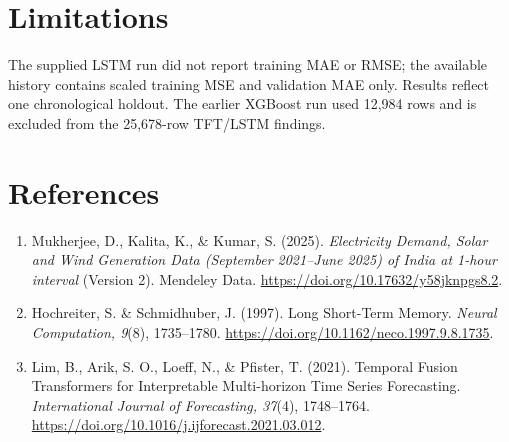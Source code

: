\documentclass[11pt,a4paper]{article}
\begin{document}
\section{Limitations}
The supplied LSTM run did not report training MAE or RMSE; the available history contains scaled training MSE and validation MAE only. Results reflect one chronological holdout. The earlier XGBoost run used 12,984 rows and is excluded from the 25,678-row TFT/LSTM findings.
\section{References}
\begin{enumerate}[leftmargin=*]
\item Mukherjee, D., Kalita, K., \& Kumar, S. (2025). \textit{Electricity Demand, Solar and Wind Generation Data (September 2021--June 2025) of India at 1-hour interval} (Version 2). Mendeley Data. \url{https://doi.org/10.17632/y58jknpgs8.2}.
\item Hochreiter, S. \& Schmidhuber, J. (1997). Long Short-Term Memory. \textit{Neural Computation, 9}(8), 1735--1780. \url{https://doi.org/10.1162/neco.1997.9.8.1735}.
\item Lim, B., Arik, S. O., Loeff, N., \& Pfister, T. (2021). Temporal Fusion Transformers for Interpretable Multi-horizon Time Series Forecasting. \textit{International Journal of Forecasting, 37}(4), 1748--1764. \url{https://doi.org/10.1016/j.ijforecast.2021.03.012}.
\end{enumerate}
\end{document}
